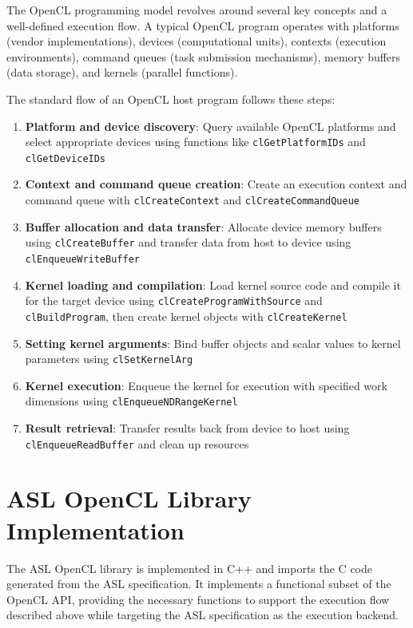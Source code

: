 The OpenCL programming model revolves around several key concepts and a
well-defined execution flow. A typical OpenCL program operates with platforms
(vendor implementations), devices (computational units), contexts (execution
environments), command queues (task submission mechanisms), memory buffers
(data storage), and kernels (parallel functions).

The standard flow of an OpenCL host program follows these steps:

\begin{enumerate}
    \item \textbf{Platform and device discovery}: Query available OpenCL
    platforms and select appropriate devices using functions like
    \texttt{clGetPlatformIDs} and \texttt{clGetDeviceIDs}
    \item \textbf{Context and command queue creation}: Create an execution
    context and command queue with \texttt{clCreateContext} and
    \texttt{clCreateCommandQueue}
    \item \textbf{Buffer allocation and data transfer}: Allocate device memory
    buffers using \texttt{clCreateBuffer} and transfer data from host to device
    using \texttt{clEnqueueWriteBuffer}
    \item \textbf{Kernel loading and compilation}: Load kernel source code and
    compile it for the target device using \texttt{clCreateProgramWithSource}
    and \texttt{clBuildProgram}, then create kernel objects with
    \texttt{clCreateKernel}
    \item \textbf{Setting kernel arguments}: Bind buffer objects and scalar
    values to kernel parameters using \texttt{clSetKernelArg}
    \item \textbf{Kernel execution}: Enqueue the kernel for execution with
    specified work dimensions using \texttt{clEnqueueNDRangeKernel}
    \item \textbf{Result retrieval}: Transfer results back from device to host
    using \texttt{clEnqueueReadBuffer} and clean up resources
\end{enumerate}

\section{ASL OpenCL Library Implementation}

The ASL OpenCL library is implemented in C++ and imports the C code generated
from the ASL specification. It implements a functional subset of the OpenCL
API, providing the necessary functions to support the execution flow described
above while targeting the ASL specification as the execution backend.

